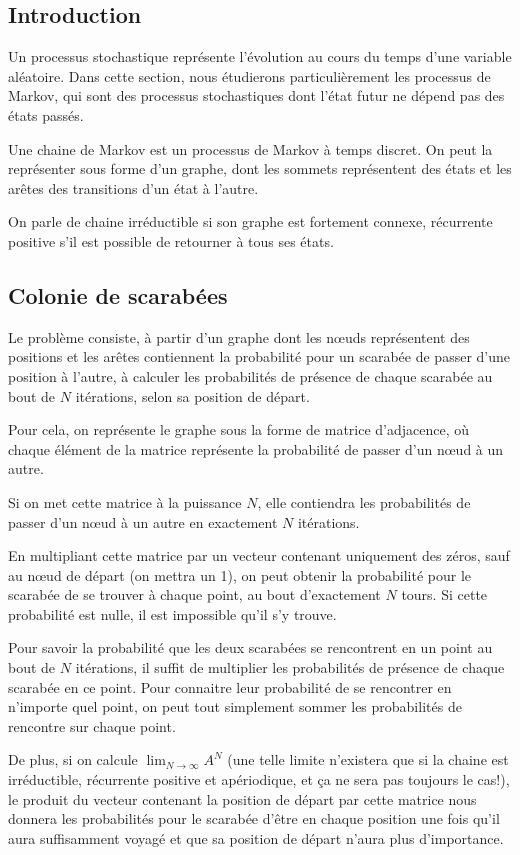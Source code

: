 \subsection{Introduction}
  Un processus stochastique représente l'évolution au cours du temps d'une
  variable aléatoire. Dans cette section, nous étudierons particulièrement les
  processus de Markov, qui sont des processus stochastiques dont l'état futur
  ne dépend pas des états passés.

  Une chaine de Markov est un processus de Markov à temps discret. On
  peut la représenter sous forme d'un graphe, dont les sommets représentent des
  états et les arêtes des transitions d'un état à l'autre.

  On parle de chaine irréductible si son graphe est fortement connexe,
  récurrente positive s'il est possible de retourner à tous ses états.

\subsection{Colonie de scarabées}
  Le problème consiste, à partir d'un graphe dont les nœuds représentent des
  positions et les arêtes contiennent la probabilité pour un scarabée de passer
  d'une position à l'autre, à calculer les probabilités de présence de chaque
  scarabée au bout de $N$ itérations, selon sa position de départ.

  Pour cela, on représente le graphe sous la forme de matrice d'adjacence, où
  chaque élément de la matrice représente la probabilité de passer d'un nœud à
  un autre.

  Si on met cette matrice à la puissance $N$, elle contiendra les probabilités
  de passer d'un nœud à un autre en exactement $N$ itérations.

  En multipliant cette matrice par un vecteur contenant uniquement des zéros,
  sauf au nœud de départ (on mettra un 1), on peut obtenir la probabilité pour
  le scarabée de se trouver à chaque point, au bout d'exactement $N$ tours.  Si
  cette probabilité est nulle, il est impossible qu'il s'y trouve.

  Pour savoir la probabilité que les deux scarabées se rencontrent en un point
  au bout de $N$ itérations, il suffit de multiplier les probabilités de
  présence de chaque scarabée en ce point. Pour connaitre leur probabilité de se
  rencontrer en n'importe quel point, on peut tout simplement sommer les
  probabilités de rencontre sur chaque point.

  De plus, si on calcule $\displaystyle\lim_{N \to \infty} A^N$ (une telle limite n'existera
  que si la chaine est irréductible, récurrente positive et apériodique, et ça
  ne sera pas toujours le cas!), le produit du vecteur contenant la position de
  départ par cette matrice nous donnera les probabilités pour le scarabée
  d'être en chaque position une fois qu'il aura suffisamment voyagé et que sa
  position de départ n'aura plus d'importance.

